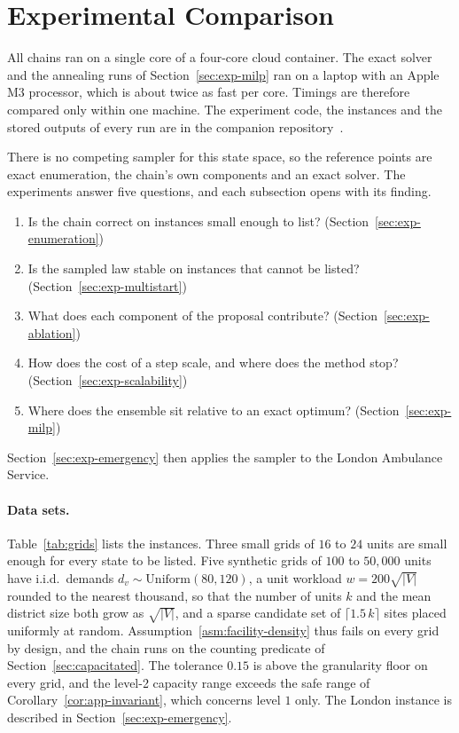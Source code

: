 \section{Experimental Comparison}\label{sec:experiments}\label{sec:setup}

All chains ran on a single core of a four-core cloud container. The exact solver and the annealing runs of Section~\ref{sec:exp-milp} ran on a laptop with an Apple M3 processor, which is about twice as fast per core. Timings are therefore compared only within one machine. The experiment code, the instances and the stored outputs of every run are in the companion repository~\citep{falcomchain}.

There is no competing sampler for this state space, so the reference points are exact enumeration, the chain's own components and an exact solver. The experiments answer five questions, and each subsection opens with its finding.
\begin{enumerate}[label=(Q\arabic*),leftmargin=3em,itemsep=1pt,topsep=3pt]
\item Is the chain correct on instances small enough to list? (Section~\ref{sec:exp-enumeration})
\item Is the sampled law stable on instances that cannot be listed? (Section~\ref{sec:exp-multistart})
\item What does each component of the proposal contribute? (Section~\ref{sec:exp-ablation})
\item How does the cost of a step scale, and where does the method stop? (Section~\ref{sec:exp-scalability})
\item Where does the ensemble sit relative to an exact optimum? (Section~\ref{sec:exp-milp})
\end{enumerate}
Section~\ref{sec:exp-emergency} then applies the sampler to the London Ambulance Service.

\paragraph{Data sets.}
Table~\ref{tab:grids} lists the instances. Three small grids of $16$ to $24$ units are small enough for every state to be listed. Five synthetic grids of $100$ to $50{,}000$ units have i.i.d.\ demands $d_v \sim \mathrm{Uniform}(80,120)$, a unit workload $w = 200\sqrt{|V|}$ rounded to the nearest thousand, so that the number of units $k$ and the mean district size both grow as $\sqrt{|V|}$, and a sparse candidate set of $\lceil 1.5\,k\rceil$ sites placed uniformly at random. Assumption~\ref{asm:facility-density} thus fails on every grid by design, and the chain runs on the counting predicate of Section~\ref{sec:capacitated}. The tolerance $0.15$ is above the granularity floor on every grid, and the level-2 capacity range exceeds the safe range of Corollary~\ref{cor:app-invariant}, which concerns level $1$ only. The London instance is described in Section~\ref{sec:exp-emergency}.

